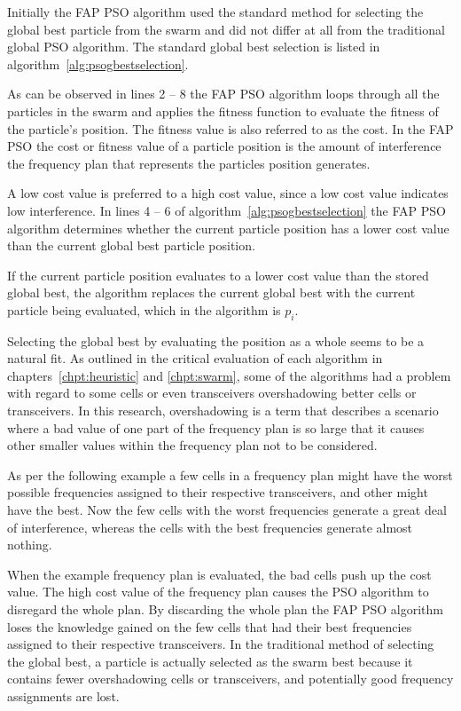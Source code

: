 Initially the \gls{FAP} \gls{PSO} algorithm used the standard method for selecting the global best particle from the swarm and did not differ at all from the traditional global \gls{PSO} algorithm. The standard global best selection is listed in algorithm~\ref{alg:psogbestselection}. 

As can be observed in lines 2 -- 8 the \gls{FAP} \gls{PSO} algorithm loops through all the particles in the swarm and applies the fitness function to evaluate the fitness of the particle's position. The fitness value is also referred to as the cost. In the \gls{FAP} \gls{PSO} the cost or fitness value of a particle position is the amount of interference the frequency plan that represents the particles position generates.

A low cost value is preferred to a high cost value, since a low cost value indicates low interference. In lines 4 -- 6 of algorithm~\ref{alg:psogbestselection} the \gls{FAP} \gls{PSO} algorithm determines whether the current particle position has a lower cost value than the current global best particle position.

If the current particle position evaluates to a lower cost value than the stored global best, the algorithm replaces the current global best with the current particle being evaluated, which in the algorithm is $p_i$.

Selecting the global best by evaluating the position as a whole seems to be a natural fit. As outlined in the critical evaluation of each algorithm in chapters~\ref{chpt:heuristic} and \ref{chpt:swarm}, some of the algorithms had a problem with regard to some cells or even transceivers overshadowing better cells or transceivers. In this research, overshadowing is a term that describes a scenario where a bad value of one part of the frequency plan is so large that it causes other smaller values within the frequency plan not to be considered. 

As per the following example a few cells in a frequency plan might have the worst possible frequencies assigned to their respective transceivers, and other might have the best. Now the few cells with the worst frequencies generate a great deal of interference, whereas the cells with the best frequencies generate almost nothing.

When the example frequency plan is evaluated, the bad cells push up the cost value. The high cost value of the frequency plan causes the \gls{PSO} algorithm to disregard the whole plan. By discarding the whole plan the \gls{FAP} \gls{PSO} algorithm loses the knowledge gained on the few cells that had their best frequencies assigned to their respective transceivers. In the traditional method of selecting the global best, a particle is actually selected as the swarm best because it contains fewer overshadowing cells or transceivers, and potentially good frequency assignments are lost.


